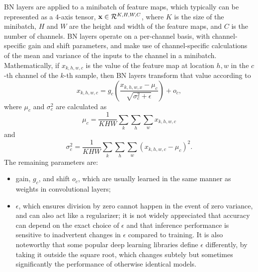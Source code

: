 \documentclass[conference]{IEEEtran}
\begin{document}
BN layers are applied to a minibatch of feature maps, which typically can be represented as a 4-axis tensor, ${\bf x}\in \mathcal{R}^{K,H,W,C}$, where $K$ is the size of the minibatch, $H$ and $W$ are the height and width of the feature maps, and $C$ is the number of channels. BN layers operate on a per-channel basis, with channel-specific gain and shift parameters, and make use of channel-specific calculations of the mean and variance of the inputs to the channel in a minibatch. Mathematically, if $x_{k,h,w,c}$ is the value of the feature map at location $h,w$ in the $c$-th channel of the $k$-th sample, then BN layers transform that value according to
\begin{equation}
\hat{x}_{k,h,w,c} = g_c\left(\frac{x_{k,h,w,x}-\mu_c}{\sqrt{\sigma^2_c+\epsilon}}\right)+o_c,
\end{equation}
where $\mu_c$ and $\sigma^2_c$ are calculated as
\begin{equation}
\mu_c = \frac{1}{KHW}\sum_k\sum_h\sum_wx_{k,h,w,c}
\end{equation}
 and
 \begin{equation}
    \sigma_c^2 = \frac{1}{KHW}\sum_k\sum_h\sum_w (x_{k,h,w,c} -\mu_c)^2.
 \end{equation}
 The remaining parameters are:
 \begin{itemize}
     \item gain, $g_c$, and shift $o_c$, which are usually learned in the same manner as weights in convolutional layers;
     \item $\epsilon$, which ensures division by zero cannot happen in the event of zero variance, and can also act like a regularizer; it is not widely appreciated that accuracy can depend on the exact choice of $\epsilon$ and that inference performance is sensitive to inadvertent changes in $\epsilon$ compared to training. It is also noteworthy that some popular deep learning libraries define $\epsilon$ differently, by taking it outside the square root, which changes subtely but sometimes significantly the performance of otherwise identical models. 
 \end{itemize}
 
\end{document}
